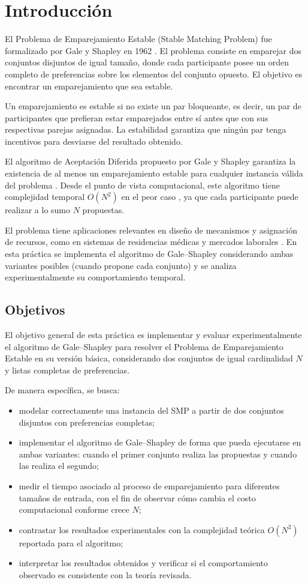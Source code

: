 \section{Introducción}

El Problema de Emparejamiento Estable (Stable Matching Problem) fue formalizado por Gale y Shapley en 1962 \cite{gale_shapley_1962}. El problema consiste en emparejar dos conjuntos disjuntos de igual tamaño, donde cada participante posee un orden completo de preferencias sobre los elementos del conjunto opuesto. El objetivo es encontrar un emparejamiento que sea estable.

Un emparejamiento es estable si no existe un par bloqueante, es decir, un par de participantes que prefieran estar emparejados entre sí antes que con sus respectivas parejas asignadas. La estabilidad garantiza que ningún par tenga incentivos para desviarse del resultado obtenido.

El algoritmo de Aceptación Diferida propuesto por Gale y Shapley garantiza la existencia de al menos un emparejamiento estable para cualquier instancia válida del problema \cite{gale_shapley_1962}. Desde el punto de vista computacional, este algoritmo tiene complejidad temporal $O(N^2)$ en el peor caso \cite{gusfield_irving_1989}, ya que cada participante puede realizar a lo sumo $N$ propuestas.

El problema tiene aplicaciones relevantes en diseño de mecanismos y asignación de recursos, como en sistemas de residencias médicas y mercados laborales \cite{roth_vande_1990}. En esta práctica se implementa el algoritmo de Gale--Shapley considerando ambas variantes posibles (cuando propone cada conjunto) y se analiza experimentalmente su comportamiento temporal.

\subsection{Objetivos}
El objetivo general de esta práctica es implementar y evaluar experimentalmente el algoritmo de Gale--Shapley para resolver el Problema de Emparejamiento Estable en su versión básica, considerando dos conjuntos de igual cardinalidad $N$ y listas completas de preferencias.

De manera específica, se busca:
\begin{itemize}
    \item modelar correctamente una instancia del SMP a partir de dos conjuntos disjuntos con preferencias completas;
    \item implementar el algoritmo de Gale--Shapley de forma que pueda ejecutarse en ambas variantes: cuando el primer conjunto realiza las propuestas y cuando las realiza el segundo;
    \item medir el tiempo asociado al proceso de emparejamiento para diferentes tamaños de entrada, con el fin de observar cómo cambia el costo computacional conforme crece $N$;
    \item contrastar los resultados experimentales con la complejidad teórica $O(N^2)$ reportada para el algoritmo;
    \item interpretar los resultados obtenidos y verificar si el comportamiento observado es consistente con la teoría revisada.
\end{itemize}
